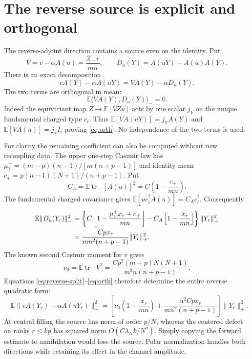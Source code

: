 \documentclass[11pt,a4paper]{article}
\newcommand{\EE}{\mathbb E}
\newcommand{\tr}{\operatorname{tr}}
\newcommand{\XX}{\mathcal X}
\begin{document}
\newpage
\section{The reverse source is explicit and orthogonal}
The reverse-adjoint direction contains a source even on the identity.
Put
\begin{equation}
 V=v-\alpha A(u)=\frac{\XX_-v}{mn},\qquad
 D_u(Y)=A(uY)-A(u)A(Y).
\end{equation}
There is an exact decomposition
\begin{equation}
 vA(Y)-\alpha A(uY)=V A(Y)-\alpha D_u(Y).
 \label{eq:reverse-split}
\end{equation}
The two terms are orthogonal in mean:
\begin{equation}
 \EE\langle V A(Y),D_u(Y)\rangle_-=0.
 \label{eq:orth}
\end{equation}
Indeed the equivariant map $Z\mapsto\EE[VZu]$ acts by one scalar
$j_V$ on the unique fundamental charged type $c_i$. Thus
$\EE[V A(uY)]=j_VA(Y)$ and $\EE[V A(u)]=j_VI$, proving
\eqref{eq:orth}. No independence of the two terms is used.

For clarity the remaining coefficient can also be computed without
new recoupling data. The upper one-step Casimir law has
$\mu_1^+=(m-p)(n-1)/[m(n+p-1)]$ and identity mean
$c_+=p(n-1)(N+1)/(n+p-1)$. Put
\begin{equation}
 C_A=\EE\tr_-[A(u)]^2=C\left(1-\frac{c_+}{mn}\right).
\end{equation}
The fundamental charged covariance gives
$\EE[u c_i^\dagger A(u)]=C_Ac_i^\dagger$. Consequently
\begin{align}
 \EE\|D_u(Y_r)\|_-^2
 &=\left\{C\left[1-\frac{\mu_1^+x_r+c_+}{mn}\right]
      -C_A\left[1-\frac{x_r}{mn}\right]\right\}\|Y_r\|_+^2\notag\\
 &=\frac{Cp x_r}{m n^2(n+p-1)}\|Y_r\|_+^2.
\end{align}
The known second Casimir moment for $v$ gives
\begin{equation}
 \nu_0=\EE\tr_-V^2
 =\frac{Cp^2(m-p)N(N+1)}{m^3n(n+p-1)}.
\end{equation}
Equations \eqref{eq:reverse-split}--\eqref{eq:orth} therefore determine
the entire reverse quadratic form:
\begin{equation}
 \boxed{\quad
 \EE\|vA(Y_r)-\alpha A(uY_r)\|_-^2
 =\left[\nu_0\left(1-\frac{x_r}{mn}\right)
  +\frac{\alpha^2Cp x_r}{mn^2(n+p-1)}\right]\|Y_r\|_+^2.
 \quad}
\end{equation}
At central filling the source has norm of order $p/N$, whereas
the centered defect on ranks $r\le kp$ has squared norm
$O(C\lambda_N k/N^2)$. Simply copying the forward estimate to
annihilation would lose the source. Polar normalization handles
both directions while retaining its effect in the channel amplitude.
\end{document}
